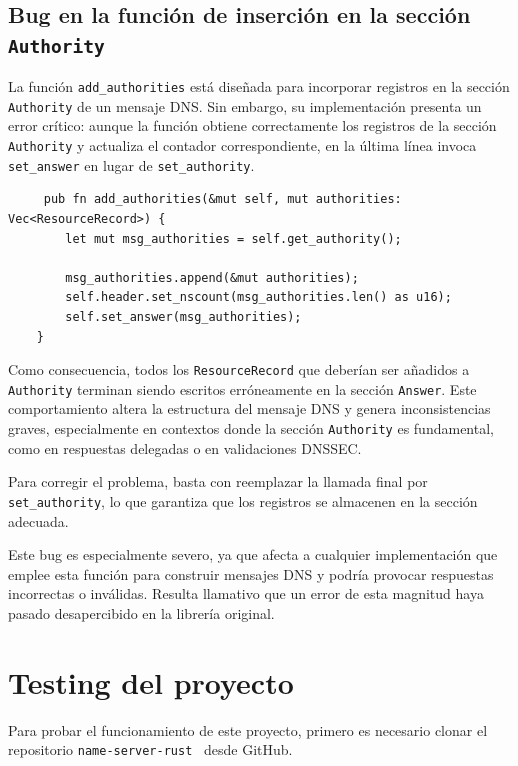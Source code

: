 \subsection{Bug en la función de inserción en la sección \texttt{Authority}}

La función \texttt{add\_authorities} está diseñada para incorporar registros en la sección \texttt{Authority} de un mensaje DNS. Sin embargo, su implementación presenta un error crítico: 
aunque la función obtiene correctamente los registros de la sección \texttt{Authority} y actualiza el contador correspondiente, en la última línea invoca \texttt{set\_answer} en lugar de 
\texttt{set\_authority}.\\

\begin{lstlisting}
     pub fn add_authorities(&mut self, mut authorities: Vec<ResourceRecord>) {
        let mut msg_authorities = self.get_authority();

        msg_authorities.append(&mut authorities);
        self.header.set_nscount(msg_authorities.len() as u16);
        self.set_answer(msg_authorities);
    }
\end{lstlisting}

Como consecuencia, todos los \texttt{ResourceRecord} que deberían ser añadidos a \texttt{Authority} terminan siendo escritos erróneamente en la sección \texttt{Answer}. Este comportamiento altera 
la estructura del mensaje DNS y genera inconsistencias graves, especialmente en contextos donde la sección \texttt{Authority} es fundamental, como en respuestas delegadas o en validaciones DNSSEC.

Para corregir el problema, basta con reemplazar la llamada final por \texttt{set\_authority}, lo que garantiza que los registros se almacenen en la sección adecuada.

Este bug es especialmente severo, ya que afecta a cualquier implementación que emplee esta función para construir mensajes DNS y podría provocar respuestas incorrectas o inválidas. 
Resulta llamativo que un error de esta magnitud haya pasado desapercibido en la librería original.

\section{Testing del proyecto}

Para probar el funcionamiento de este proyecto, primero es necesario clonar el repositorio \texttt{name-server-rust}~\cite{nameserver-rust} desde GitHub.

